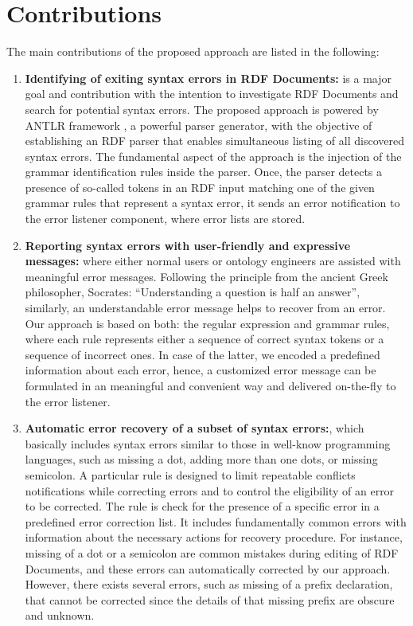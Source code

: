 

\section {Contributions}
The main contributions of the proposed approach are listed in the following:
\begin{enumerate}
	\item  {\bf Identifying of exiting syntax errors in RDF Documents:} is a major goal and contribution with the intention to investigate RDF Documents and search for potential syntax errors. 
	The proposed approach is powered by ANTLR framework \cite{ANTLR:Website:Online}, a powerful parser generator, with the objective of establishing an RDF parser that enables simultaneous listing of all discovered syntax errors. 
	The fundamental aspect of the approach is the injection of the grammar identification rules inside the parser. 
	Once, the parser detects a presence of so-called tokens in an RDF input matching one of the given grammar rules that represent a syntax error, it sends an error notification to the error listener component, where error lists are stored.
	\item {\bf Reporting syntax errors with user-friendly and expressive messages:} where either normal users or ontology engineers are assisted with meaningful error messages. 
	Following the principle from the ancient Greek philosopher, Socrates: “Understanding a question is half an answer”\cite{Socrates:quote:Online}, similarly, an understandable error message helps to recover from an error. 
	Our approach is based on both: the regular expression and grammar rules, where each rule represents either a sequence of correct syntax tokens or a sequence of incorrect ones. 
	In case of the latter, we encoded a predefined information about each error, hence, a customized error message can be formulated in an meaningful and convenient way and delivered on-the-fly to the error listener.  
	\item {\bf Automatic error recovery of a subset of syntax errors:}, which basically includes syntax errors similar to those in well-know programming languages, such as missing a dot, adding more than one dots, or missing semicolon. 
	A particular rule is designed to limit repeatable conflicts notifications while correcting errors and to control the eligibility of an error to be corrected. 
	The rule is check for the presence of a specific error in a predefined error correction list.
	It includes fundamentally common errors with information about the necessary actions for recovery procedure. 
	For instance, missing of a dot or a semicolon are common mistakes during editing of RDF Documents, and these errors can automatically corrected by our approach.
	However, there exists several errors, such as missing of a prefix declaration, that cannot be corrected since the details of that missing prefix are obscure and unknown.     
\end{enumerate}

